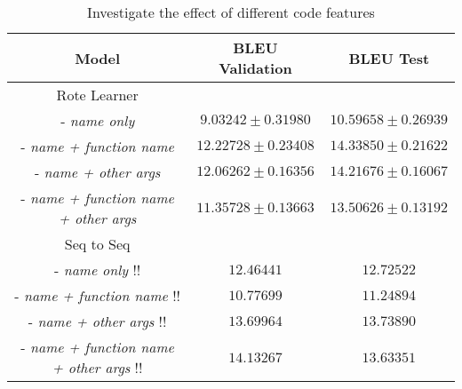 \begin{table}[!ht]
\begin{center}
\begin{tabular}{ c | c | c }
    Model                               & BLEU Validation            & BLEU Test  \\
    \hline
    \hline
    Rote Learner                        &                  & \\    
    - \textit{name only}                & $ 9.03242  \pm  0.31980 $ & $ 10.59658 \pm 0.26939 $  \\
    - \textit{name + function name}     & $ 12.22728 \pm  0.23408 $ & $ 14.33850 \pm 0.21622 $  \\
    - \textit{name + other args}        & $ 12.06262 \pm  0.16356 $ & $ 14.21676 \pm 0.16067 $  \\
    - \textit{name + function name + other args}  & $ 11.35728 \pm  0.13663 $ & $ 13.50626 \pm 0.13192 $ \\
    \hline
    \hline
    Seq to Seq                          &                  & \\
    - \textit{name only}    !!            & $ 12.46441 $ & $ 12.72522 $  \\
    - \textit{name + function name} !!    & $ 10.77699 $ & $ 11.24894 $ \\
    - \textit{name + other args}  !!    & $ 13.69964 $ & $ 13.73890 $  \\
    - \textit{name + function name + other args}   !! & $ 14.13267 $ & $ 13.63351 $ \\
    
    \hline
\end{tabular}
\caption {Investigate the effect of different code features}
\label{table:tokenization}
\end{center}
\end{table}





